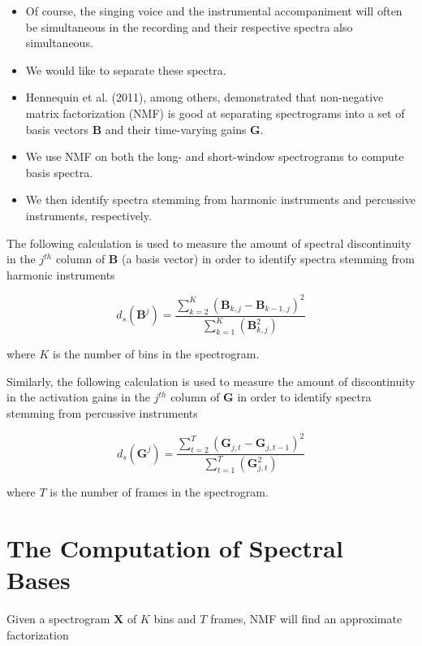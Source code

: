 \documentclass[72pt]{article}
\begin{document}
\begin{Huge}
\newpage
\begin{itemize}
    \item Of course, the singing voice and the instrumental accompaniment will often be
    simultaneous in the recording and their respective spectra also simultaneous.
    \item We would like to separate these spectra.
    \item Hennequin et al. (2011), among others, demonstrated that non-negative
matrix factorization (NMF) is good at separating spectrograms into a set of basis
vectors \( \mathbf{B} \) and their time-varying gains \( \mathbf{G} \).
    \item We use NMF on both the long- and short-window spectrograms to compute
basis spectra.
    \item We then identify spectra stemming from harmonic instruments and
percussive instruments, respectively.
\end{itemize}

\newpage

The following calculation is used to measure the amount of spectral
discontinuity in the \( j^{th} \) column of \( \mathbf{B} \) (a basis vector) in
order to identify spectra stemming from harmonic instruments

\[ 
d_s(\mathbf{B}^j) =
\frac{\sum\limits_{k=2}^{K}(\mathbf{B}_{k,j}-\mathbf{B}_{k-1,j})^2}{
    \sum\limits_{k=1}^{K}(\mathbf{B}_{k,j}^{2})}
\]

where \( K \) is the number of bins in the spectrogram.

\newpage

Similarly, the following calculation is used to measure the amount of
discontinuity in the activation gains in the \( j^{th} \) column of \(
\mathbf{G} \) in order to identify spectra stemming from percussive instruments

\[ 
d_s(\mathbf{G}^j) =
\frac{\sum\limits_{t=2}^{T}(\mathbf{G}_{j,t}-\mathbf{G}_{j,t-1})^2}{
    \sum\limits_{t=1}^{T}(\mathbf{G}_{j,t}^{2})}
\]

where \( T \) is the number of frames in the spectrogram.

\newpage

\section*{The Computation of Spectral Bases}
Given a spectrogram \( \mathbf{X} \) of \( K \) bins and \( T \) frames, NMF
will find an approximate factorization


\end{Huge}
\end{document}
